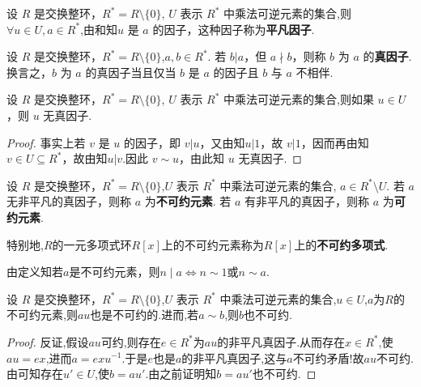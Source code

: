 \documentclass[../../main.tex]{subfiles}%
\begin{document}
\begin{definition}
设 \( R \) 是交换整环，\( R^* = R \setminus \{0\} \), \( U \) 表示 \( R^* \) 中乘法可逆元素的集合,则\( \forall u \in U, a \in R^* \),由和知\( u\) 是 \( a \) 的因子，这种因子称为\textbf{平凡因子}.
\end{definition}

\begin{definition}
设 \( R \) 是交换整环，\( R^* = R \setminus \{0\} \),\( a, b \in R^* \). 若 \( b|a \)，但 \( a \nmid b \)，则称 \( b \) 为 \( a \) 的\textbf{真因子}.换言之，\( b \) 为 \( a \) 的真因子当且仅当 \( b \) 是 \( a \) 的因子且 \( b \) 与 \( a \) 不相伴.
\end{definition}

\begin{theorem}\label{theorem:单位群中元素都无真因子}
设 \( R \) 是交换整环，\( R^* = R \setminus \{0\} \), \( U \) 表示 \( R^* \) 中乘法可逆元素的集合,则如果 \( u \in U \)，则 \( u \) 无真因子.
\end{theorem}
\begin{proof}

事实上若 \( v \) 是 \( u \) 的因子，即 \( v|u \)，又由知\( u|1 \)，故 \( v|1 \)，因而再由知\( v \in U \subseteq R^*\)，故由知$u|v$.因此 \( v \sim u \)，由此知 \( u \) 无真因子.

\end{proof}

\begin{definition}
设 \( R \) 是交换整环，\( R^* = R \setminus \{0\} \),\( U \) 表示 \( R^* \) 中乘法可逆元素的集合, \( a \in R^* \setminus U \). 若 \( a \) 无非平凡的真因子，则称 \( a \) 为\textbf{不可约元素}. 若 \( a \) 有非平凡的真因子，则称 \( a \) 为\textbf{可约元素}.

特别地,$R$的一元多项式环$R[x]$上的不可约元素称为$R[x]$上的\textbf{不可约多项式}.
\end{definition}
\begin{remark}
由定义知若$a$是不可约元素，则$n\mid a\iff n\sim 1\text{或}n\sim a$.
\end{remark}

\begin{proposition}\label{proposition:不可约元素乘单位仍不可约}
设 \( R \) 是交换整环，\( R^* = R \setminus \{0\} \),\( U \) 表示 \( R^* \) 中乘法可逆元素的集合,$u\in U$,$a$为$R$的不可约元素,则$au$也是不可约的.进而,若$a\sim b$,则$b$也不可约.
\end{proposition}
\begin{proof}

反证,假设$au$可约,则存在$e\in R^*$为$au$的非平凡真因子.从而存在$x\in R^*$,使$au=ex$,进而$a=exu^{-1}$.于是$e$也是$a$的非平凡真因子,这与$a$不可约矛盾!故$au$不可约.由可知存在$u'\in U$,使$b=au'$.由之前证明知$b=au'$也不可约.

\end{proof}
\end{document}
